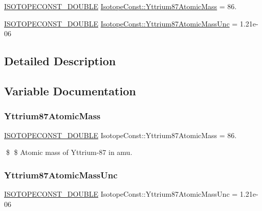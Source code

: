 \begin{DoxyCompactItemize}
\item 
\mbox{\hyperlink{group___isotope_const-_macros_ga8f45a7272ce02c0b4c65c44636ed719a}{I\+S\+O\+T\+O\+P\+E\+C\+O\+N\+S\+T\+\_\+\+D\+O\+U\+B\+LE}} \mbox{\hyperlink{group___isotope_const-_yttrium-_y87_ga133ce41daac05254e1c255c5756097cf}{Isotope\+Const\+::\+Yttrium87\+Atomic\+Mass}} = 86.
\item 
\mbox{\hyperlink{group___isotope_const-_macros_ga8f45a7272ce02c0b4c65c44636ed719a}{I\+S\+O\+T\+O\+P\+E\+C\+O\+N\+S\+T\+\_\+\+D\+O\+U\+B\+LE}} \mbox{\hyperlink{group___isotope_const-_yttrium-_y87_gaac008ef10e81c3ed743b2e029ecdd375}{Isotope\+Const\+::\+Yttrium87\+Atomic\+Mass\+Unc}} = 1.\+21e-\/06
\end{DoxyCompactItemize}


\subsection{Detailed Description}


\subsection{Variable Documentation}
\mbox{\label{group___isotope_const-_yttrium-_y87_ga133ce41daac05254e1c255c5756097cf}} 
\subsubsection{\texorpdfstring{Yttrium87\+Atomic\+Mass}{Yttrium87AtomicMass}}
{\footnotesize\ttfamily \mbox{\hyperlink{group___isotope_const-_macros_ga8f45a7272ce02c0b4c65c44636ed719a}{I\+S\+O\+T\+O\+P\+E\+C\+O\+N\+S\+T\+\_\+\+D\+O\+U\+B\+LE}} Isotope\+Const\+::\+Yttrium87\+Atomic\+Mass = 86.}

\$ \$ Atomic mass of Yttrium-\/87 in amu. \mbox{\label{group___isotope_const-_yttrium-_y87_gaac008ef10e81c3ed743b2e029ecdd375}} 
\subsubsection{\texorpdfstring{Yttrium87\+Atomic\+Mass\+Unc}{Yttrium87AtomicMassUnc}}
{\footnotesize\ttfamily \mbox{\hyperlink{group___isotope_const-_macros_ga8f45a7272ce02c0b4c65c44636ed719a}{I\+S\+O\+T\+O\+P\+E\+C\+O\+N\+S\+T\+\_\+\+D\+O\+U\+B\+LE}} Isotope\+Const\+::\+Yttrium87\+Atomic\+Mass\+Unc = 1.\+21e-\/06}

